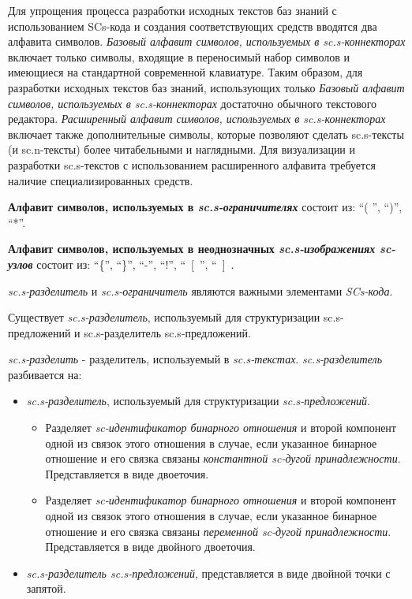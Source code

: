Для упрощения процесса разработки исходных текстов баз знаний с использованием SCs-кода и создания соответствующих средств вводятся два алфавита символов. \textit{Базовый алфавит символов, используемых в sc.s-коннекторах} включает только символы, входящие в переносимый набор символов и имеющиеся на стандартной современной клавиатуре. Таким образом, для разработки исходных текстов баз знаний, использующих только \textit{Базовый алфавит символов, используемых в sc.s-коннекторах} достаточно обычного текстового редактора. \textit{Расширенный алфавит символов, используемых в sc.s-коннекторах} включает также дополнительные символы, которые позволяют сделать sc.s-тексты (и sc.n-тексты) более читабельными и наглядными. Для визуализации и разработки sc.s-текстов с использованием расширенного алфавита требуется наличие специализированных средств.


\textbf{Алфавит символов, используемых в \textit{sc.s-ограничителях}} состоит из: ``( ''{}, ``)''{}, ``*''{}.

\textbf{Алфавит символов, используемых в неоднозначных \textit{sc.s-изображениях sc-узлов}} состоит из:
``\{''{}, ``\}''{}, 
``-''{}, ``!''{}, ``~[ \,''{}, ``~] \,{}.


\begin{SCn}
\end{SCn}

\textit{sc.s-разделитель} и \textit{sc.s-ограничитель} являются важными элементами \textit{SCs-кода}.

Существует \textit{sc.s-разделитель}, используемый для структуризации sc.s-предложений и sc.s-разделитель sc.s-предложений.

\textit{sc.s-разделить} - разделитель, используемый в \textit{sc.s-текстах}. \textit{sc.s-разделитель} разбивается на:
\begin{itemize}
	\item \textit{sc.s-разделитель}, используемый для структуризации \textit{\textit{sc.s-предложений}}.
	\begin{itemize}
		\item Разделяет \textit{sc-идентификатор бинарного отношения} и второй компонент одной из связок этого отношения в случае, если указанное бинарное отношение и его связка связаны \textit{константной sc-дугой принадлежности}. Представляется в виде двоеточия.

		\item Разделяет \textit{sc-идентификатор бинарного отношения} и второй компонент одной из связок этого отношения в случае, если указанное бинарное отношение и его связка связаны \textit{переменной sc-дугой принадлежности}. Представляется в виде двойного двоеточия.
		
	\end{itemize}
	\item  \textit{sc.s-разделитель \textit{sc.s-предложений}}, представляется в виде двойной точки с запятой.    
\end{itemize}



